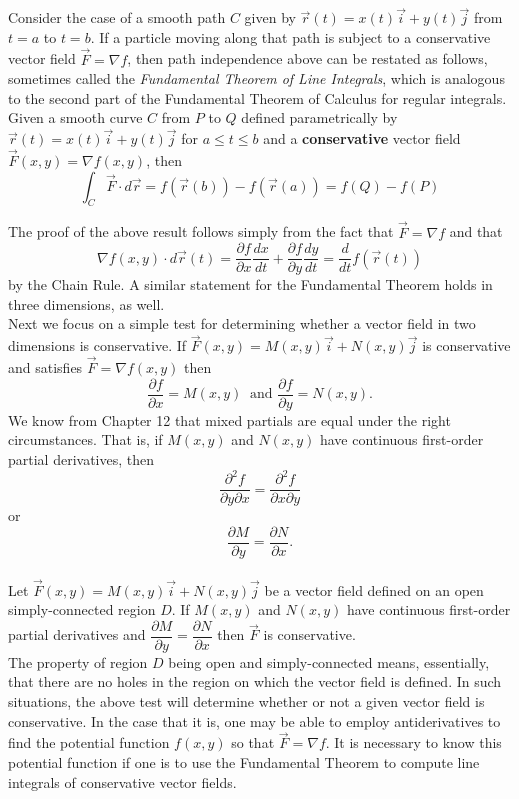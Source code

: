 Consider the case of a smooth path $C$ given by $\vec r(t) = x(t) \vec i + y(t) \vec j$ from $t = a$ to $t = b$. If a particle moving along that path is subject to a conservative vector field $\vec F = \nabla f$, then path independence above can be restated as follows, sometimes called the \emph{Fundamental Theorem of Line Integrals}, which is analogous to the second part of the Fundamental Theorem of Calculus for regular integrals.\\

{Given a smooth curve $C$ from $P$ to $Q$ defined parametrically by $\vec r(t) = x(t) \vec i + y(t) \vec j$ for $a \leq t \leq b$ and a \textbf{conservative} vector field $\vec F(x,y) = \nabla f(x,y)$, then
$$\int_C \vec F \cdot d\vec r = f\left( \vec r(b) \right) - f\left( \vec r(a) \right) = f(Q) - f(P)$$
}

The proof of the above result follows simply from the fact that $\vec F = \nabla f$ and that 
$$\nabla f(x,y) \cdot d\vec r(t) = \dfrac{\partial f}{\partial x} \dfrac{dx}{dt} + \dfrac{\partial f}{\partial y} \dfrac{dy}{dt} = \dfrac{d}{dt} f\left( \vec r(t) \right)$$
by the Chain Rule.  A similar statement for the Fundamental Theorem holds in three dimensions, as well.\\

Next we focus on a simple test for determining whether a vector field in two dimensions is conservative.  If $\vec F(x,y) = M(x,y) \vec i + N(x,y) \vec j$ is conservative and satisfies $\vec F = \nabla f(x,y)$ then
$$\dfrac{\partial f}{\partial x} = M(x,y) \: \text{ and } \dfrac{\partial f}{\partial y} = N(x,y).$$
We know from Chapter 12 that mixed partials are equal under the right circumstances.  That is, if $M(x,y)$ and $N(x,y)$ have continuous  first-order partial derivatives, then
$$\dfrac{\partial^2 f}{\partial y \partial x} = \dfrac{\partial^2 f}{\partial x \partial y}$$
or
$$\dfrac{\partial M}{\partial y} = \dfrac{\partial N}{\partial x}.$$\\

{Let $\vec F(x,y) = M(x,y) \vec i + N(x,y) \vec j$ be a vector field defined on an open simply-connected region $D$.  If $M(x,y)$ and $N(x,y)$ have continuous first-order partial derivatives and $\dfrac{\partial M}{\partial y} = \dfrac{\partial N}{\partial x}$ then $\vec F$ is conservative.
}\\

The property of region $D$ being open and simply-connected means, essentially, that there are no holes in the region on which the vector field is defined. In such situations, the above test will determine whether or not a given vector field is conservative.  In the case that it is, one may be able to employ antiderivatives to find the potential function $f(x,y)$ so that $\vec F = \nabla f$.  It is necessary to know this potential function if one is to use the Fundamental Theorem to compute line integrals of conservative vector fields.\\



